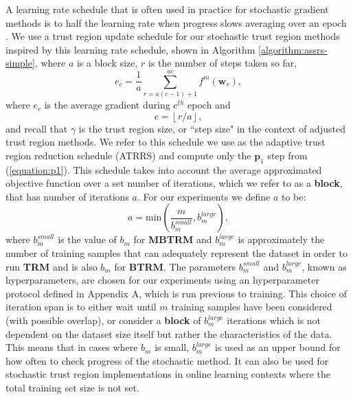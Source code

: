 \documentclass[letterpaper,12pt,titlepage,oneside,final]{book}
\begin{document}
	A learning rate schedule that is often used in practice for stochastic gradient methods is to half the learning rate when progress slows averaging over an epoch \cite{tutorial}. We use a trust region update schedule for our stochastic trust region methods inspired by this learning rate schedule, shown in Algorithm \ref{algorithm:assrs-simple}, where $a$ is a block size, $r$ is the number of steps taken so far,
	\begin{equation}
	e_{c} = \frac{1}{a}\sum_{r = a(c-1) + 1}^{ac}{f^{m}(\mathbf{w}_{r})},
	\end{equation}
	where $e_{c}$ is the average gradient during $c^{th}$ epoch and
	\begin{equation}
	c = \left \lfloor{r/a}\right \rfloor,
	\end{equation}
	and recall that $\gamma$ is the trust region size, or ``step size" in the context of adjusted trust region methods.
	 We refer to this schedule we use as the adaptive trust region reduction schedule (ATRRS) and compute only the $\mathbf{p}_{1}$ step from (\ref{equation:p1}). This schedule takes into account the average approximated objective function over a set number of iterations, which we refer to as a \textbf{block}, that has number of iterations $a$. For our experiments we define $a$ to be:
	\begin{equation}
	a = \text{min}(\frac{m}{b_{m}^{small}}, b_{m}^{large}),
	\end{equation}
	where $b_{m}^{small}$ is the value of $b_{m}$ for \textbf{MBTRM} and $b_{m}^{large}$ is approximately the number of training samples that can adequately represent the dataset in order to run \textbf{TRM} and is also $b_{m}$ for \textbf{BTRM}. The parameters $b_{m}^{small}$ and $b_{m}^{large}$, known as hyperparameters, are chosen for our experiments using an hyperparameter protocol defined in Appendix A, which is run previous to training. This choice of iteration span is to either wait until $m$ training samples have been considered (with possible overlap), or consider a \textbf{block} of $b_{m}^{large}$ iterations which is not dependent on the dataset size itself but rather the characteristics of the data. This means that in cases where $b_{m}$ is small, $b_{m}^{large}$ is used as an upper bound for how often to check progress of the stochastic method. It can also be used for stochastic trust region implementations in online learning contexts where the total training set size is not set.
	
\end{document}
